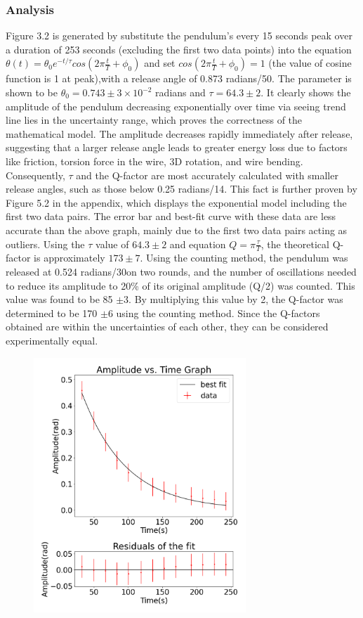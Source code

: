\documentclass[11pt,titlepage,a4paper,twocolumn]{article}
\begin{document}
{        \subsubsection{Analysis}
            \hspace{\parindent}\hspace{\parindent}Figure 3.2 is generated by substitute the pendulum's every 15 seconds peak over a duration of 253 seconds (excluding the first two data points) into the equation $\theta(t) = \theta_0 e^{-t/\tau}cos(2\pi \frac{t}{T}+\phi_0)$ and set $cos(2\pi \frac{t}{T}+\phi_0) = 1$ (the value of cosine function is 1 at peak),with a release angle of 0.873 radians/50\degree. The parameter is shown to be $\theta_0 = 0.743 \pm 3 \times10^{-2}$ radians and $\tau = 64.3 \pm 2$. It clearly shows the amplitude of the pendulum decreasing exponentially over time via seeing trend line lies in the uncertainty range, which proves the correctness of the mathematical model. The amplitude decreases rapidly immediately after release, suggesting that a larger release angle leads to greater energy loss due to factors like friction, torsion force in the wire, 3D rotation, and wire bending. Consequently, $\tau$ and the Q-factor are most accurately calculated with smaller release angles, such as those below 0.25 radians/14\degree. This fact is further proven by Figure 5.2 in the appendix, which displays the exponential model including the first two data pairs. The error bar and best-fit curve with these data are less accurate than the above graph, mainly due to the first two data pairs acting as outliers. Using the $\tau$ value of $64.3 \pm 2$ and equation $Q=\pi\frac{\tau}{T}$, the theoretical Q-factor is approximately $173 \pm 7$. Using the counting method, the pendulum was released at 0.524 radians/30\degree on two rounds, and the number of oscillations needed to reduce its amplitude to 20\% of its original amplitude (Q/2) was counted. This value was found to be 85 $\pm 3$. By multiplying this value by 2, the Q-factor was determined to be 170 $\pm 6$ using the counting method. Since the Q-factors obtained are within the uncertainties of each other, they can be considered experimentally equal.
                \begin{figure}[H]
                    \centering
                    \includegraphics[width=8cm]{3.2.png}

\end{figure}}
\end{document}
